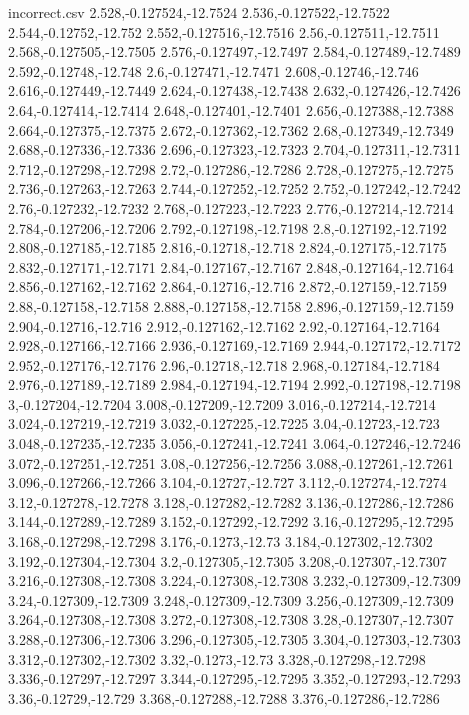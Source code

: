 \begin{filecontents*}{incorrect.csv}
2.528,-0.127524,-12.7524
2.536,-0.127522,-12.7522
2.544,-0.12752,-12.752
2.552,-0.127516,-12.7516
2.56,-0.127511,-12.7511
2.568,-0.127505,-12.7505
2.576,-0.127497,-12.7497
2.584,-0.127489,-12.7489
2.592,-0.12748,-12.748
2.6,-0.127471,-12.7471
2.608,-0.12746,-12.746
2.616,-0.127449,-12.7449
2.624,-0.127438,-12.7438
2.632,-0.127426,-12.7426
2.64,-0.127414,-12.7414
2.648,-0.127401,-12.7401
2.656,-0.127388,-12.7388
2.664,-0.127375,-12.7375
2.672,-0.127362,-12.7362
2.68,-0.127349,-12.7349
2.688,-0.127336,-12.7336
2.696,-0.127323,-12.7323
2.704,-0.127311,-12.7311
2.712,-0.127298,-12.7298
2.72,-0.127286,-12.7286
2.728,-0.127275,-12.7275
2.736,-0.127263,-12.7263
2.744,-0.127252,-12.7252
2.752,-0.127242,-12.7242
2.76,-0.127232,-12.7232
2.768,-0.127223,-12.7223
2.776,-0.127214,-12.7214
2.784,-0.127206,-12.7206
2.792,-0.127198,-12.7198
2.8,-0.127192,-12.7192
2.808,-0.127185,-12.7185
2.816,-0.12718,-12.718
2.824,-0.127175,-12.7175
2.832,-0.127171,-12.7171
2.84,-0.127167,-12.7167
2.848,-0.127164,-12.7164
2.856,-0.127162,-12.7162
2.864,-0.12716,-12.716
2.872,-0.127159,-12.7159
2.88,-0.127158,-12.7158
2.888,-0.127158,-12.7158
2.896,-0.127159,-12.7159
2.904,-0.12716,-12.716
2.912,-0.127162,-12.7162
2.92,-0.127164,-12.7164
2.928,-0.127166,-12.7166
2.936,-0.127169,-12.7169
2.944,-0.127172,-12.7172
2.952,-0.127176,-12.7176
2.96,-0.12718,-12.718
2.968,-0.127184,-12.7184
2.976,-0.127189,-12.7189
2.984,-0.127194,-12.7194
2.992,-0.127198,-12.7198
3,-0.127204,-12.7204
3.008,-0.127209,-12.7209
3.016,-0.127214,-12.7214
3.024,-0.127219,-12.7219
3.032,-0.127225,-12.7225
3.04,-0.12723,-12.723
3.048,-0.127235,-12.7235
3.056,-0.127241,-12.7241
3.064,-0.127246,-12.7246
3.072,-0.127251,-12.7251
3.08,-0.127256,-12.7256
3.088,-0.127261,-12.7261
3.096,-0.127266,-12.7266
3.104,-0.12727,-12.727
3.112,-0.127274,-12.7274
3.12,-0.127278,-12.7278
3.128,-0.127282,-12.7282
3.136,-0.127286,-12.7286
3.144,-0.127289,-12.7289
3.152,-0.127292,-12.7292
3.16,-0.127295,-12.7295
3.168,-0.127298,-12.7298
3.176,-0.1273,-12.73
3.184,-0.127302,-12.7302
3.192,-0.127304,-12.7304
3.2,-0.127305,-12.7305
3.208,-0.127307,-12.7307
3.216,-0.127308,-12.7308
3.224,-0.127308,-12.7308
3.232,-0.127309,-12.7309
3.24,-0.127309,-12.7309
3.248,-0.127309,-12.7309
3.256,-0.127309,-12.7309
3.264,-0.127308,-12.7308
3.272,-0.127308,-12.7308
3.28,-0.127307,-12.7307
3.288,-0.127306,-12.7306
3.296,-0.127305,-12.7305
3.304,-0.127303,-12.7303
3.312,-0.127302,-12.7302
3.32,-0.1273,-12.73
3.328,-0.127298,-12.7298
3.336,-0.127297,-12.7297
3.344,-0.127295,-12.7295
3.352,-0.127293,-12.7293
3.36,-0.12729,-12.729
3.368,-0.127288,-12.7288
3.376,-0.127286,-12.7286

\end{filecontents*}
